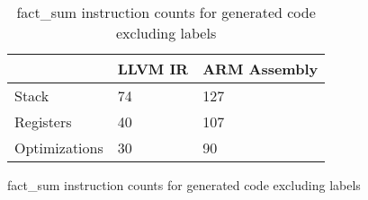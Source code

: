 \begin{table}[h!]
\centering
\begin{tabular}{p{}p{}p{}}
  \hline
 & LLVM IR & ARM Assembly \\ 
  \hline
Stack &  74 & 127 \\ 
  Registers &  40 & 107 \\ 
  Optimizations &  30 &  90 \\ 
   \hline
\end{tabular}
\caption{fact\_sum instruction counts for generated code excluding labels}
\caption{fact\_sum instruction counts for generated code excluding labels}
\end{table}
